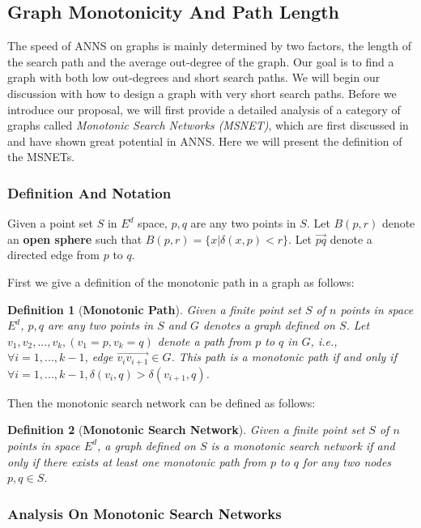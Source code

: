 \documentclass{vldb}
\newtheorem{definition}{Definition}
\def\ie {\emph{i.e}.} \def\Ie{\emph{I.e}.}
\begin{document}
\subsection{Graph Monotonicity And Path Length}
The speed of ANNS on graphs is mainly determined by two factors, the length of the search path and the average out-degree of the graph. Our goal is to find a graph with both low out-degrees and short search paths. We will begin our discussion with how to design a graph with very short search paths. Before we introduce our proposal, we will first provide a detailed analysis of a category of graphs called \textit{Monotonic Search Networks (MSNET)}, which are first discussed in \cite{dearholt1988monotonic} and have shown great potential in ANNS. Here we will present the definition of the MSNETs. 
\subsubsection{Definition And Notation}
Given a point set $S$ in $E^d$ space, $p, q$ are any two points in $S$. Let $B(p, r)$ denote an \textbf{open sphere} such that $B(p, r) = \{x|\delta(x,p) < r\}$. Let $\overset{\longrightarrow}{pq}$ denote a directed edge from $p$ to $q$. 

First we give a definition of the monotonic path in a graph as follows:
\begin{definition}[\textbf{Monotonic Path}]
Given a finite point set $S$ of $n$ points in space $E^d$, $p, q$ are any two points in $S$ and $G$ denotes a graph defined on $S$. Let $v_1, v_2, ... , v_k, (v_1=p, v_k=q)$ denote a path from $p$ to $q$ in $G$, \ie, $\forall{i = 1,...,k-1}$, edge $\overset{\longrightarrow}{v_iv_{i+1}} \in G$. This path is a monotonic path if and only if $\forall{i = 1,...,k-1}, \delta(v_i, q) > \delta(v_{i+1},q)$.
\end{definition}
Then the monotonic search network can be defined as follows:
\begin{definition}[\textbf{Monotonic Search Network}]
Given a finite point set $S$ of $n$ points in space $E^d$, a graph defined on $S$ is a monotonic search network if and only if there exists at least one monotonic path from $p$ to $q$ for any two nodes $p,q \in S$.
\end{definition}



\subsubsection{Analysis On Monotonic Search Networks}
\end{document}
